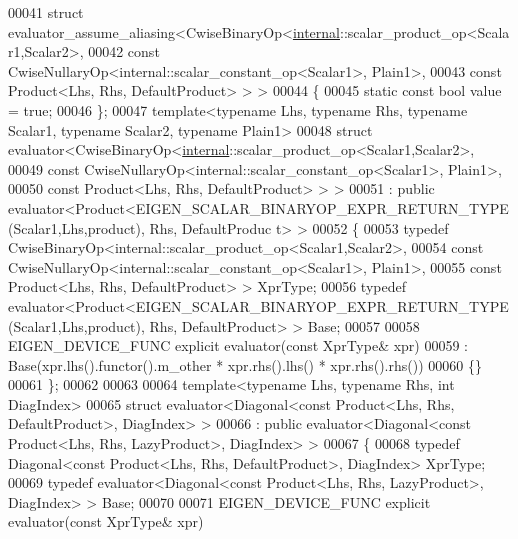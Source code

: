 \begin{DoxyCode}
00041 \textcolor{keyword}{struct }evaluator\_assume\_aliasing<CwiseBinaryOp<\hyperlink{namespaceinternal}{internal}::scalar\_product\_op<Scalar1,Scalar2>,
00042                                                const CwiseNullaryOp<internal::scalar\_constant\_op<Scalar1>, 
      Plain1>,
00043                                                const Product<Lhs, Rhs, DefaultProduct> > >
00044 \{
00045   \textcolor{keyword}{static} \textcolor{keyword}{const} \textcolor{keywordtype}{bool} value = \textcolor{keyword}{true};
00046 \};
00047 \textcolor{keyword}{template}<\textcolor{keyword}{typename} Lhs, \textcolor{keyword}{typename} Rhs, \textcolor{keyword}{typename} Scalar1, \textcolor{keyword}{typename} Scalar2, \textcolor{keyword}{typename} Plain1>
00048 \textcolor{keyword}{struct }evaluator<CwiseBinaryOp<\hyperlink{namespaceinternal}{internal}::scalar\_product\_op<Scalar1,Scalar2>,
00049                                const CwiseNullaryOp<internal::scalar\_constant\_op<Scalar1>, Plain1>,
00050                                const Product<Lhs, Rhs, DefaultProduct> > >
00051  : \textcolor{keyword}{public} evaluator<Product<EIGEN\_SCALAR\_BINARYOP\_EXPR\_RETURN\_TYPE(Scalar1,Lhs,product), Rhs, DefaultProduc
      t> >
00052 \{
00053   \textcolor{keyword}{typedef} CwiseBinaryOp<internal::scalar\_product\_op<Scalar1,Scalar2>,
00054                                \textcolor{keyword}{const} CwiseNullaryOp<internal::scalar\_constant\_op<Scalar1>, Plain1>,
00055                                \textcolor{keyword}{const} Product<Lhs, Rhs, DefaultProduct> > XprType;
00056   \textcolor{keyword}{typedef} evaluator<Product<EIGEN\_SCALAR\_BINARYOP\_EXPR\_RETURN\_TYPE(Scalar1,Lhs,product), Rhs,
       DefaultProduct> > Base;
00057 
00058   EIGEN\_DEVICE\_FUNC \textcolor{keyword}{explicit} evaluator(\textcolor{keyword}{const} XprType& xpr)
00059     : Base(xpr.lhs().functor().m\_other * xpr.rhs().lhs() * xpr.rhs().rhs())
00060   \{\}
00061 \};
00062 
00063 
00064 \textcolor{keyword}{template}<\textcolor{keyword}{typename} Lhs, \textcolor{keyword}{typename} Rhs, \textcolor{keywordtype}{int} DiagIndex>
00065 \textcolor{keyword}{struct }evaluator<Diagonal<const Product<Lhs, Rhs, DefaultProduct>, DiagIndex> > 
00066  : \textcolor{keyword}{public} evaluator<Diagonal<const Product<Lhs, Rhs, LazyProduct>, DiagIndex> >
00067 \{
00068   \textcolor{keyword}{typedef} Diagonal<const Product<Lhs, Rhs, DefaultProduct>, DiagIndex> XprType;
00069   \textcolor{keyword}{typedef} evaluator<Diagonal<const Product<Lhs, Rhs, LazyProduct>, DiagIndex> > Base;
00070   
00071   EIGEN\_DEVICE\_FUNC \textcolor{keyword}{explicit} evaluator(\textcolor{keyword}{const} XprType& xpr)

\end{DoxyCode}
